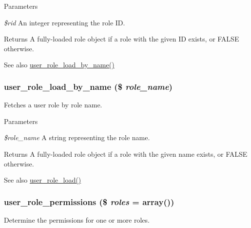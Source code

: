 \begin{DoxyParams}{Parameters}
\item[{\em \$rid}]An integer representing the role ID.\end{DoxyParams}
\begin{DoxyReturn}{Returns}
A fully-\/loaded role object if a role with the given ID exists, or FALSE otherwise.
\end{DoxyReturn}
\begin{DoxySeeAlso}{See also}
\hyperlink{user_8module_a46775f7a4d73479dd21569ef97cb77ec}{user\_\-role\_\-load\_\-by\_\-name()} 
\end{DoxySeeAlso}
\hypertarget{user_8module_a46775f7a4d73479dd21569ef97cb77ec}{
\subsubsection[{user\_\-role\_\-load\_\-by\_\-name}]{\setlength{\rightskip}{0pt plus 5cm}user\_\-role\_\-load\_\-by\_\-name (\$ {\em role\_\-name})}}
\label{user_8module_a46775f7a4d73479dd21569ef97cb77ec}
Fetches a user role by role name.


\begin{DoxyParams}{Parameters}
\item[{\em \$role\_\-name}]A string representing the role name.\end{DoxyParams}
\begin{DoxyReturn}{Returns}
A fully-\/loaded role object if a role with the given name exists, or FALSE otherwise.
\end{DoxyReturn}
\begin{DoxySeeAlso}{See also}
\hyperlink{user_8module_a523043011b1e6d3f168ee7a5e8674734}{user\_\-role\_\-load()} 
\end{DoxySeeAlso}
\hypertarget{user_8module_a52111bf669fd6850eb3580e5f62d9236}{
\subsubsection[{user\_\-role\_\-permissions}]{\setlength{\rightskip}{0pt plus 5cm}user\_\-role\_\-permissions (\$ {\em roles} = {\ttfamily array()})}}
\label{user_8module_a52111bf669fd6850eb3580e5f62d9236}
Determine the permissions for one or more roles.


